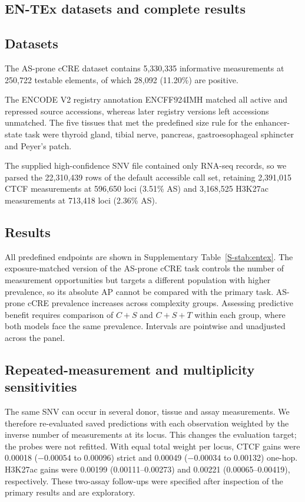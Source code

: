 \documentclass[11pt]{article}
\begin{document}
\begin{bibunit}[unsrtnat]
\section{EN-TEx datasets and complete results}
\label{S-snote:entex}

\subsection{Datasets}
The AS-prone cCRE dataset contains 5,330,335 informative measurements at 250,722 testable elements, of which 28,092 (11.20\%) are positive.

The ENCODE V2 registry annotation ENCFF924IMH matched all active and repressed source accessions, whereas later registry versions left accessions unmatched. The five tissues that met the predefined size rule for the enhancer-state task were thyroid gland, tibial nerve, pancreas, gastroesophageal sphincter and Peyer's patch.

The supplied high-confidence SNV file contained only RNA-seq records, so we parsed the 22,310,439 rows of the default accessible call set, retaining 2,391,015 CTCF measurements at 596,650 loci (3.51\% AS) and 3,168,525 H3K27ac measurements at 713,418 loci (2.36\% AS).

\subsection{Results}
All predefined endpoints are shown in Supplementary Table~\ref{S-stab:entex}. The exposure-matched version of the AS-prone cCRE task controls the number of measurement opportunities but targets a different population with higher prevalence, so its absolute AP cannot be compared with the primary task. AS-prone cCRE prevalence increases across complexity groups. Assessing predictive benefit requires comparison of $C+S$ and $C+S+T$ within each group, where both models face the same prevalence. Intervals are pointwise and unadjusted across the panel.


\subsection{Repeated-measurement and multiplicity sensitivities}
The same SNV can occur in several donor, tissue and assay measurements. We therefore re-evaluated saved predictions with each observation weighted by the inverse number of measurements at its locus. This changes the evaluation target; the probes were not refitted. With equal total weight per locus, CTCF gains were 0.00018 ($-0.00054$ to 0.00096) strict and 0.00049 ($-0.00034$ to 0.00132) one-hop. H3K27ac gains were 0.00199 (0.00111--0.00273) and 0.00221 (0.00065--0.00419), respectively. These two-assay follow-ups were specified after inspection of the primary results and are exploratory.


\end{bibunit}
\end{document}
